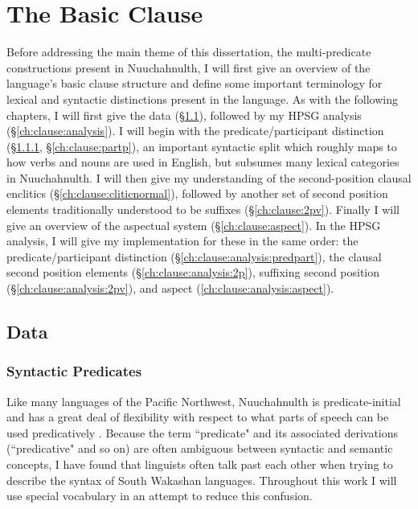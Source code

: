 \chapter{The Basic Clause} \label{ch:clause}

Before addressing the main theme of this dissertation, the multi-predicate constructions present in Nuuchahnulth, I will first give an overview of the language's basic clause structure and define some important terminology for lexical and syntactic distinctions present in the language. As with the following chapters, I will first give the data (\S\ref{ch:clause:data}), followed by my HPSG analysis (\S\ref{ch:clause:analysis}). I will begin with the predicate/participant distinction (\S\ref{ch:clause:predp}, \S\ref{ch:clause:partp}), an important syntactic split which roughly maps to how verbs and nouns are used in English, but subsumes many lexical categories in Nuuchahnulth. I will then give my understanding of the second-position clausal enclitics (\S\ref{ch:clause:cliticnormal}), followed by another set of second position elements traditionally understood to be suffixes (\S\ref{ch:clause:2pv}). Finally I will give an overview of the aspectual system (\S\ref{ch:clause:aspect}). In the HPSG analysis, I will give my implementation for these in the same order: the predicate/participant distinction (\S\ref{ch:clause:analysis:predpart}), the clausal second position elements (\S\ref{ch:clause:analysis:2p}), suffixing second position (\S\ref{ch:clause:analysis:2pv}), and aspect (\ref{ch:clause:analysis:aspect}).

\section{Data} \label{ch:clause:data}

\subsection{Syntactic Predicates} \label{ch:clause:predp}

Like many languages of the Pacific Northwest, Nuuchahnulth is predicate-initial and has a great deal of flexibility with respect to what parts of speech can be used predicatively \citep{jacobsen1979}. Because the term ``predicate" and its associated derivations (``predicative" and so on) are often ambiguous between syntactic and semantic concepts, I have found that linguists often talk past each other when trying to describe the syntax of South Wakashan languages. Throughout this work I will use special vocabulary in an attempt to reduce this confusion.

